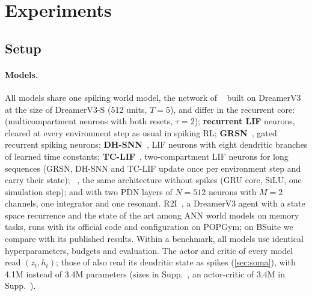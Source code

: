 \section{Experiments}
\label{sec:experiments}

\begin{table}[t]
  \centering\tabfont
  \caption{\textbf{Memory in reinforcement learning.}
  BSuite memory length~\cite{osband2020bsuite}: success as in R2I~\cite{samsami2024r2i}, \ie whether the evaluation return reaches 0.9 within the budget (\cmark) or not (\xmark); steps and returns in Supp.~. $^\dagger$Lengths, budget and training windows of R2I (1M steps; reward head with one output per action).
  POPGym RepeatPrevious~\cite{morad2023popgym} with the environment settings of R2I's code: max-mean episodic return, the metric of POPGym (chance $=-0.5$).
  \nr: not run, as the model fails at a shorter length.
  $^\ddagger$R2I with its official code and configuration for 2M steps, measured on its training episodes (for our models the two measures differ by at most 0.07).}
  \label{tab:rl}
  
\end{table}

\subsection{Setup}
\label{sec:setup}

\paragraph{Models.}
All models share one spiking world model, the network of \swm~\cite{sun2025spikingwm} built on DreamerV3 at the size of DreamerV3-S (512 units, $T=5$), and differ in the recurrent core:
\textbf{\swm} (multicompartment neurons with both resets, $\tau=2$);
\textbf{recurrent LIF} neurons, cleared at every environment step as usual in spiking RL;
\textbf{GRSN}~\cite{qin2025grsn}, gated recurrent spiking neurons;
\textbf{DH-SNN}~\cite{zheng2024dhsnn}, LIF neurons with eight dendritic branches of learned time constants;
\textbf{TC-LIF}~\cite{zhang2024tclif}, two-compartment LIF neurons for long sequences (GRSN, DH-SNN and TC-LIF update once per environment step and carry their state);
\textbf{\dv}~\cite{hafner2025dreamerv3}, the same architecture without spikes (GRU core, SiLU, one simulation step);
and \textbf{\method} with two PDN layers of $N=512$ neurons with $M=2$ channels, one integrator and one resonant.
R2I~\cite{samsami2024r2i}, a DreamerV3 agent with a state space recurrence and the state of the art among ANN world models on memory tasks, runs with its official code and configuration on POPGym; on BSuite we compare with its published results.
Within a benchmark, all models use identical hyperparameters, budgets and evaluation.
The actor and critic of every model read $(z_t,h_t)$; those of \method also read its dendritic state as spikes (\cref{sec:soma}), with 4.1M instead of 3.4M parameters (sizes in Supp.~, an actor-critic of 3.4M in Supp.~).

